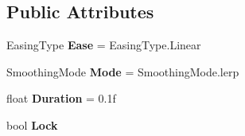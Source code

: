 \subsection*{Public Attributes}
\begin{DoxyCompactItemize}
\item 
\mbox{\label{class_radical_library_1_1_smooth_vector3_a4aed287600e7d2c12203d098556612d8}} 
Easing\+Type {\bfseries Ease} = Easing\+Type.\+Linear
\item 
\mbox{\label{class_radical_library_1_1_smooth_vector3_a8ae26fac85686d14a2a1dd56e3832077}} 
Smoothing\+Mode {\bfseries Mode} = Smoothing\+Mode.\+lerp
\item 
\mbox{\label{class_radical_library_1_1_smooth_vector3_af2a047088e4e9dd49cf95202782d36c1}} 
float {\bfseries Duration} = 0.\+1f
\item 
\mbox{\label{class_radical_library_1_1_smooth_vector3_a656550e3ddafe5b7315116de5f57d76f}} 
bool {\bfseries Lock}
\end{DoxyCompactItemize}
